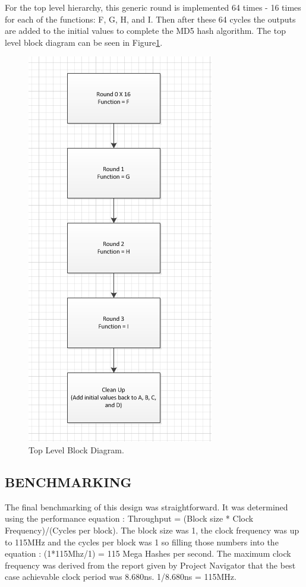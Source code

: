		For the top level hierarchy, this generic round is implemented 64 times - 16 times for each of the functions: F, G, H, and I.  Then after these 64 cycles the outputs are added to the initial values to complete the MD5 hash algorithm.  The top level block diagram can be seen in Figure\ref{fig:Top}.
\begin{figure}[h]
\centering
\includegraphics[width=0.7\linewidth]{./Top}
\caption{Top Level Block Diagram.}
\label{fig:Top}
\end{figure}
	\subsection{BENCHMARKING}
		The final benchmarking of this design was straightforward.  It was determined using the performance equation : Throughput = (Block size * Clock Frequency)/(Cycles per block).  The block size was 1, the clock frequency was up to 115MHz and the cycles per block was 1 so filling those numbers into the equation : (1*115Mhz/1) = 115 Mega Hashes per second.  The maximum clock frequency was derived from the report given by Project Navigator that the best case achievable clock period was 8.680ns.  1/8.680ns = 115MHz.

